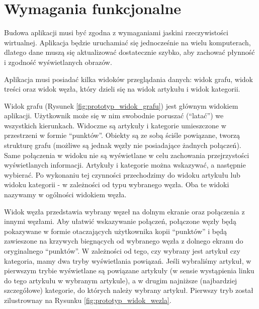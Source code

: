 \section{Wymagania funkcjonalne}
\label{sec:wymagania-funkcjonalne}

Budowa aplikacji musi być zgodna z wymaganiami jaskini rzeczywistości wirtualnej. Aplikacja będzie uruchamiać się jednocześnie na wielu komputerach, dlatego dane muszą się aktualizować dostatecznie szybko, aby zachować płynność i zgodność wyświetlanych obrazów.

Aplikacja musi posiadać kilka widoków przeglądania danych: widok grafu, widok treści oraz widok węzła, który dzieli się na widok artykułu i widok kategorii.

Widok grafu (Rysunek \ref{fig:prototyp_widok_grafu}) jest głównym widokiem aplikacji. Użytkownik może się w nim swobodnie poruszać (``latać'') we wszystkich kierunkach. Widoczne są artykuły i kategorie umieszczone w przestrzeni w formie ``punktów''. Obiekty są ze sobą ściśle powiązane, tworzą strukturę grafu (możliwe są jednak węzły nie posiadające żadnych połączeń). Same połączenia w widoku nie są wyświetlane w celu zachowania przejrzystości wyświetlanych informacji. Artykuły i kategorie można wskazywać, a następnie wybierać. Po wykonaniu tej czynności przechodzimy do widoku artykułu lub widoku kategorii - w zależności od typu wybranego węzła. Oba te widoki nazywamy w ogólności widokiem węzła.


Widok węzła przedstawia wybrany węzeł na dolnym ekranie oraz połączenia z innymi węzłami. Aby ułatwić wskazywanie połączeń, połączone węzły będą pokazywane w formie otaczających użytkownika kopii ``punktów'' i będą zawieszone na krzywych biegnących od wybranego węzła z dolnego ekranu do oryginalnego ``punktów''. W zależności od tego, czy wybrany jest artykuł czy kategoria, mamy dwa tryby wyświetlania powiązań. Jeśli wybraliśmy artykuł, w pierwszym trybie wyświetlane są powiązane artykuły (w sensie wystąpienia linku do tego artykułu w wybranym artykule), a w drugim najniższe (najbardziej szczegółowe) kategorie, do których należy wybrany artykuł. Pierwszy tryb został zilustrownay na Rysunku \ref{fig:prototyp_widok_wezla}.


